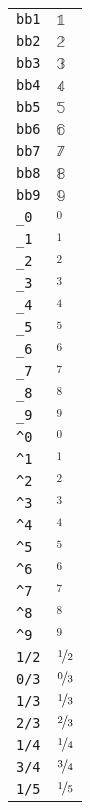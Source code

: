 \begin{longtable}{ll}
\texttt{bb1}&${}{\mathbb{1}}{}$\\
\texttt{bb2}&${}{\mathbb{2}}{}$\\
\texttt{bb3}&${}{\mathbb{3}}{}$\\
\texttt{bb4}&${}{\mathbb{4}}{}$\\
\texttt{bb5}&${}{\mathbb{5}}{}$\\
\texttt{bb6}&${}{\mathbb{6}}{}$\\
\texttt{bb7}&${}{\mathbb{7}}{}$\\
\texttt{bb8}&${}{\mathbb{8}}{}$\\
\texttt{bb9}&${}{\mathbb{9}}{}$\\
\texttt{\_0}&${}_0 {}$\\
\texttt{\_1}&${}_1 {}$\\
\texttt{\_2}&${}_2 {}$\\
\texttt{\_3}&${}_3 {}$\\
\texttt{\_4}&${}_4 {}$\\
\texttt{\_5}&${}_5 {}$\\
\texttt{\_6}&${}_6 {}$\\
\texttt{\_7}&${}_7 {}$\\
\texttt{\_8}&${}_8 {}$\\
\texttt{\_9}&${}_9 {}$\\
\texttt{\textasciicircum 0}&${}^0 {}$\\
\texttt{\textasciicircum 1}&${}^1 {}$\\
\texttt{\textasciicircum 2}&${}^2 {}$\\
\texttt{\textasciicircum 3}&${}^3 {}$\\
\texttt{\textasciicircum 4}&${}^4 {}$\\
\texttt{\textasciicircum 5}&${}^5 {}$\\
\texttt{\textasciicircum 6}&${}^6 {}$\\
\texttt{\textasciicircum 7}&${}^7 {}$\\
\texttt{\textasciicircum 8}&${}^8 {}$\\
\texttt{\textasciicircum 9}&${}^9 {}$\\
\texttt{1/2}&${}\nicefrac{1}{2} {}$\\
\texttt{0/3}&${}\nicefrac{0}{3} {}$\\
\texttt{1/3}&${}\nicefrac{1}{3} {}$\\
\texttt{2/3}&${}\nicefrac{2}{3} {}$\\
\texttt{1/4}&${}\nicefrac{1}{4} {}$\\
\texttt{3/4}&${}\nicefrac{3}{4} {}$\\
\texttt{1/5}&${}\nicefrac{1}{5} {}$\\

\end{longtable}
